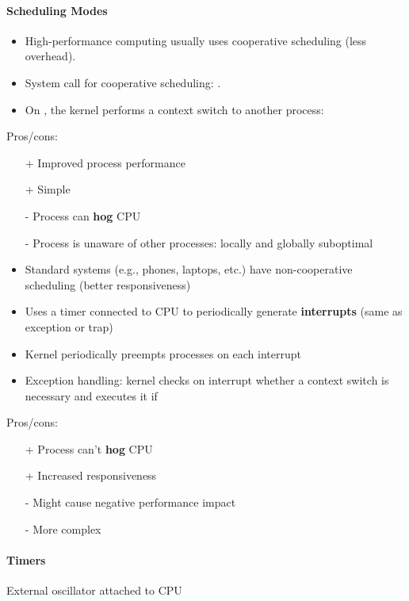 \paragraph{Scheduling Modes}

\begin{itemize}
    \item High-performance computing usually uses cooperative scheduling (less overhead).
    \item System call for cooperative scheduling: .
    \item On , the kernel performs a context switch to another process:
\end{itemize}
Pros/cons:
\begin{itemize}
    \item[+] Improved process performance
    \item[+] Simple
    \item[-] Process can \textbf{hog} CPU
    \item[-] Process is unaware of other processes: locally and globally suboptimal
\end{itemize}

\newpar{}
\begin{itemize}
    \item Standard systems (e.g., phones, laptops, etc.) have non-cooperative scheduling (better responsiveness)
    \item Uses a timer connected to CPU to periodically generate \textbf{interrupts} (same as exception or trap)
    \item Kernel periodically preempts processes on each interrupt
    \item Exception handling: kernel checks on interrupt whether a context switch is necessary and executes it if
\end{itemize}
Pros/cons:
\begin{itemize}
    \item[+] Process can't \textbf{hog} CPU
    \item[+] Increased responsiveness
    \item[-] Might cause negative performance impact
    \item[-] More complex
\end{itemize}

\paragraph{Timers}
External oscillator attached to CPU

